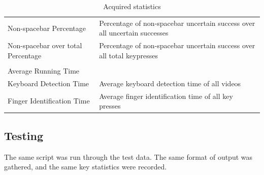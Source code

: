 \documentclass{report}
\begin{document}
\begin{table}[H]
\begin{tabular}{ p{} p{} }
		Non-spacebar Percentage                     & Percentage of non-spacebar uncertain success over all uncertain successes               \\
		Non-spacebar over total \newline Percentage & Percentage of non-spacebar uncertain success over all total keypresses                  \\
		\\[0.25cm]
		\hline
		Average Running Time                                                                                                                  \\
		\hline
		Keyboard Detection Time                     & Average keyboard detection time of all videos                                           \\
		Finger Identification Time                  & Average finger identification time of all key presses                                   \\
	\end{tabular}
	\caption{\label{tab:acquired-stats}Acquired statistics}
\end{table}

\subsection{Testing}
The same script was run through the test data. The same format of output was
gathered, and the same key statistics were recorded.




\end{document}

